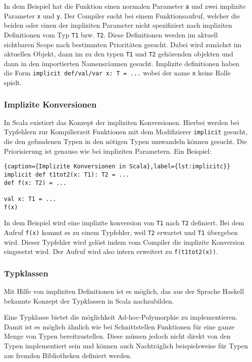 In dem Beispiel hat die Funktion einen normalen Parameter \texttt{a} und zwei  implizite Parameter
\texttt{x} und \texttt{y}. Der Compiler sucht bei einem  Funktionsaufruf, welcher die beiden oder
einen der impliziten Parameter nicht  spezifiziert nach impliziten Definitionen vom Typ \texttt{T1}
bzw. \texttt{T2}.  Diese Definitionen werden im aktuell sichtbaren Scope nach bestimmten
Prioritäten gesucht. Dabei wird zunächst im aktuellen Objekt, dann im zu den  typen \texttt{T1} und
\texttt{T2} gehörenden objekten und dann in den  importierten Namensräumen gesucht. Implizite
definitionen haben die Form  \texttt{implicit def/val/var x: T = ...} wobei der name \texttt{x}
keine Rolle  spielt.

\subsubsection{Implizite Konversionen}

In Scala existiert das Konzept der impliziten Konversionen. Hierbei werden bei  Typfehlern zur
Kompilierzeit Funktionen mit dem Modifizierer \texttt{implicit}  gesucht, die den gefundenen Typen
in den nötigen Typen umwandeln können gesucht.  Die Priorisierung ist genauso wie bei impliziten
Parametern. Ein Beispiel:

\begin{lstlisting}{caption={Implizite Konversionen in Scala},label={lst:implicitc}}
implicit def t1tot2(x: T1): T2 = ...
def f(x: T2) = ...

val x: T1 = ...
f(x)
\end{lstlisting}

In dem Beispiel wird eine implizite konversion von \texttt{T1} nach \texttt{T2}  definiert. Bei dem
Aufruf \texttt{f(x)} kommt es zu einem Typfehler, weil  \texttt{T2} erwartet und \texttt{T1}
übergeben wird. Dieser Typfehler wird  gelöst indem vom Compiler die implizite Konversion eingesetzt
wird. Der Aufruf  wird also intern erweitert zu \texttt{f(t1tot2(x))}.

\subsubsection{Typklassen}

Mit Hilfe von impliziten Definitionen ist es möglich, das aus der Sprache Haskell  bekannte Konzept
der Typklassen in Scala nachzubilden.

Eine Typklasse bietet die möglichkeit Ad-hoc-Polymorphie zu implementieren.  Damit ist es möglich
ähnlich wie bei Schnittstellen Funktionen für eine ganze  Menge von Typen bereitzustellen. Diese
müssen jedoch nicht direkt von den Typen  implementiert sein und können auch Nachträglich
beispielsweise für Typen aus  fremden Bibliotheken definiert werden.

